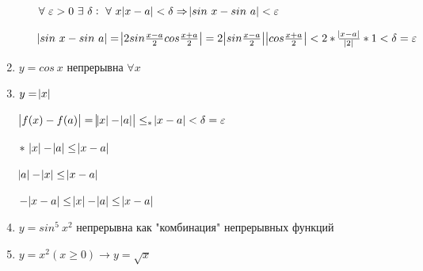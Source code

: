 \documentclass{article}
\begin{document}
\begin{enumerate}
\begin{enumerate}
            \( \forall\ \varepsilon > 0\ \exists\ \delta:\ \forall\ x \abs{x - a} < \delta \Rightarrow \abs{sin\ x - sin\ a} < \varepsilon \)
            
            \(\abs{sin\ x - sin\ a} = \abs{2sin\frac{x-a}{2}cos\frac{x+a}{2}} = 2\abs{sin\frac{x - a}{2}}\abs{cos\frac{x + a}{2}} < 2 * \frac{\abs{x - a}}{\abs{2}} * 1 < \delta = \varepsilon\)
        \end{enumerate}

        \item \(y = cos\ x\) непрерывна \(\forall x\)        
        \item \(y = \abs{x}\)

        \(\abs{f(x)-f(a)} = \abs{\abs{x}-\abs{a}} \leq_* \abs{x-a} < \delta = \varepsilon\)

        \(*\ \abs{x}-\abs{a} \leq \abs{x-a}\)
        
        \(\abs{a}-\abs{x} \leq \abs{x-a}\)

        \(-\abs{x-a} \leq \abs{x} - \abs{a} \leq \abs{x-a}\)

        \item \( y = sin^5\ x^2 \) непрерывна как "комбинация" непрерывных функций
        \item \( y = x^2 (x \geq 0) \rightarrow y = \sqrt{x} \) 
    \end{enumerate}
\end{document}
